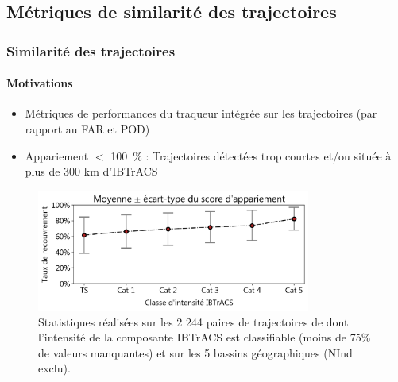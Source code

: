 \documentclass[aspectratio=169, usepdftitle=false, xcolor={dvipsnames}, 9pt,table]{beamer}
\begin{document}
\subsection[Similarité des trajectoires]{Métriques de similarité des trajectoires}
\makesubsecslide
\begin{frame}[c]
    \frametitle{Similarité des trajectoires}
    \framesubtitle{Motivations}
    \small
    \vspace{1em}
    \begin{definition}
        \begin{itemize}
            \item Métriques de performances du traqueur \alert{intégrée} sur les trajectoires (par rapport au FAR et POD)
            \item Appariement $<$ 100~\% : Trajectoires détectées trop courtes \alert{et/ou} située à plus de 300 km d'IBTrACS
        \end{itemize}
    \end{definition}
    \begin{figure}
        \centering
        \includegraphics[height=4cm]{Figures/coverage_ratio.png}
        \captionsetup{width=0.75\textwidth}
        \caption{Statistiques réalisées sur les 2 244 paires de trajectoires de \cite{dulac_assessing_2023} dont l'intensité de la composante IBTrACS est
        classifiable (moins de 75\% de valeurs manquantes) et sur les 5 bassins géographiques (NInd exclu).}
    \end{figure}
\end{frame}
\end{document}
